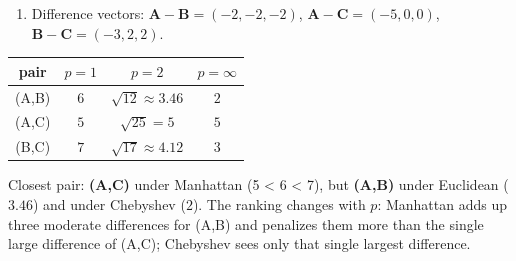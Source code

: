 \documentclass[
  11pt,
]{article}
\newcounter{none} %
\providecommand{\tightlist}{%
  \setlength{\itemsep}{0pt}\setlength{\parskip}{0pt}}
\begin{document}
\begin{solutionbox}

\begin{enumerate}
\def\labelenumi{(\alph{enumi})}
\tightlist
\item
  Difference vectors: \(\mathbf{A}-\mathbf{B} = (-2,-2,-2)\),
  \(\mathbf{A}-\mathbf{C} = (-5,0,0)\),
  \(\mathbf{B}-\mathbf{C} = (-3,2,2)\).
\end{enumerate}

{\def\LTcaptype{none} %
\begin{longtable}[]{@{}cccc@{}}
\toprule\noalign{}
pair & \(p=1\) & \(p=2\) & \(p=\infty\) \\
\midrule\noalign{}
\endhead
\bottomrule\noalign{}
\endlastfoot
(A,B) & \(6\) & \(\sqrt{12}\approx3.46\) & \(2\) \\
(A,C) & \(5\) & \(\sqrt{25}=5\) & \(5\) \\
(B,C) & \(7\) & \(\sqrt{17}\approx4.12\) & \(3\) \\
\end{longtable}
}

Closest pair: \textbf{(A,C)} under Manhattan (5 \textless{} 6
\textless{} 7), but \textbf{(A,B)} under Euclidean (\(3.46\)) and under
Chebyshev (\(2\)). The ranking changes with \(p\): Manhattan adds up
three moderate differences for (A,B) and penalizes them more than the
single large difference of (A,C); Chebyshev sees only that single
largest difference.


\end{solutionbox}
\end{document}
